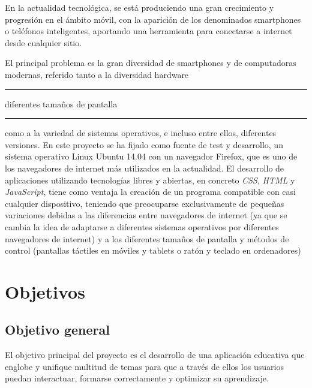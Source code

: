\documentclass[a4paper, 12pt]{book}
\begin{document}
En la actualidad tecnol\'ogica, se est\'a produciendo una gran crecimiento y progresi\'on en el \'ambito m\'ovil, con la aparici\'on de los 
denominados smartphones o tel\'efonos inteligentes, aportando una herramienta para conectarse a internet desde cualquier sitio.

El principal problema es la gran diversidad de smartphones y de computadoras modernas, referido tanto a la diversidad hardware 
\rule[1mm]{4mm}{0.1mm}diferentes tama\~nos de pantalla\rule[1mm]{4mm}{0.1mm} como a la variedad de sistemas operativos, e incluso entre ellos, 
diferentes versiones. En este proyecto se ha fijado 
como fuente de test y desarrollo, un sistema operativo Linux Ubuntu 14.04 con un navegador Firefox, que es uno de los navegadores de internet m\'as 
utilizados en la actualidad. El desarrollo de aplicaciones utilizando tecnolog\'ias libres y abiertas, en concreto \textit{CSS}, \textit{HTML} y 
\textit{JavaScript}, tiene como ventaja la creaci\'on de un programa compatible con casi cualquier dispositivo, teniendo que preocuparse exclusivamente 
de peque\~nas variaciones debidas a las diferencias entre navegadores de internet (ya que se cambia
la idea de adaptarse a diferentes sistemas operativos por diferentes navegadores de internet) y a los diferentes tama\~nos de pantalla y m\'etodos
de control (pantallas t\'actiles en m\'oviles y tablets o rat\'on y teclado en ordenadores)








\cleardoublepage
\chapter{Objetivos}
\label{chap:objetivos}

\section{Objetivo general}
\label{sec:objetivo-general}
El objetivo principal del proyecto es el desarrollo de una aplicaci\'on educativa que englobe y unifique multitud de temas para que a trav\'es de ellos los usuarios 
puedan interactuar, formarse correctamente y optimizar su aprendizaje.
\end{document}
